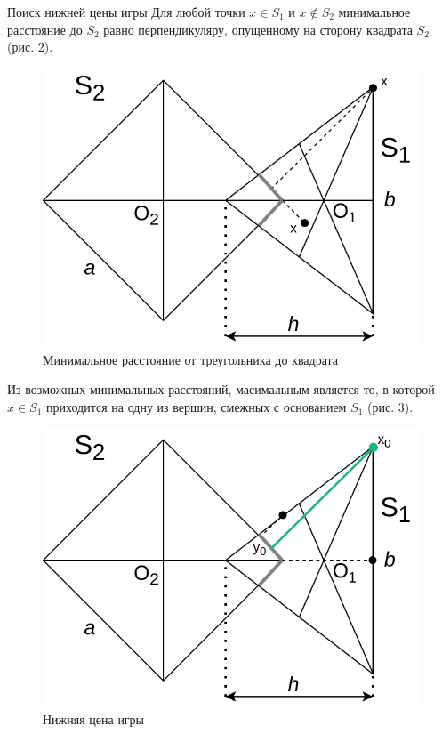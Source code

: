 \documentclass[12pt,a4paper]{article}
\begin{document}
Поиск нижней цены игры
Для любой точки $x \in S_1$ и $x \notin S_2$ минимальное расстояние до $S_2$
равно перпендикуляру, опущенному на сторону квадрата $S_2$ (рис. 2).
\begin{figure}[ht]
  \centering
  \includegraphics[scale=0.4]{persuit_min.drawio.png}
  \caption{Минимальное расстояние от треугольника до квадрата}
\end{figure}

\pagebreak

Из возможных минимальных расстояний, масимальным является то, в которой $x \in S_1$
приходится на одну из вершин, смежных с основанием $S_1$ (рис. 3).
\begin{figure}[ht]
  \centering
  \includegraphics[scale=0.4]{persuit_min_max.drawio.png}
  \caption{Нижняя цена игры}
\end{figure}
\end{document}
